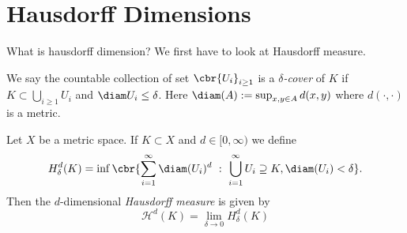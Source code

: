 \section{Hausdorff Dimensions}

What is hausdorff dimension? We first have to look at Hausdorff measure. 

We say the countable collection of set $\cbr{U_i}_{i \geq 1}$ is a \emph{$\delta$-cover} of $K$ if $K \subset \bigcup_{i \geq 1} U_i$ and $\diam U_i \leq \delta$. Here $\diam(A):= \sup_{x, y \in A}d(x,y)$ where $d(\cdot, \cdot)$ is a metric.

\begin{defi}
	Let $X$ be a metric space. If $K \subset X$ and $d \in [0, \infty)$ we define
	\begin{equation}
		H^{d}_{\delta}(K) = \inf \cbr{\sum_{i =1}^{\infty} \diam(U_i)^d \ : \ \bigcup_{i = 1}^{\infty} U_i \supseteq K, \diam(U_i) < \delta}.
	\end{equation}
	Then the $d$-dimensional \emph{Hausdorff measure} is given by
	\begin{equation}
		\mathcal{H}^d(K) = \lim_{\delta \to 0} H^{d}_{\delta}(K)
	\end{equation}
\end{defi}


